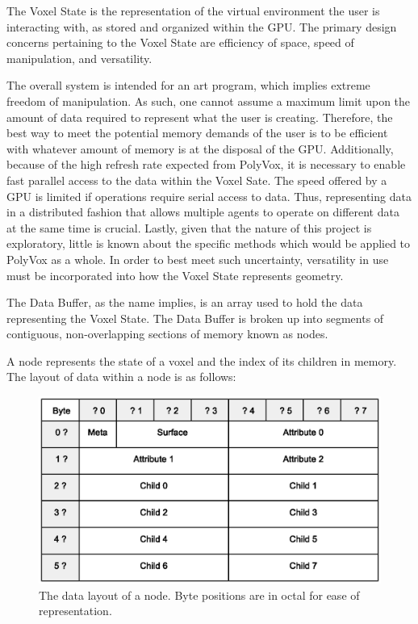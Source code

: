 \documentclass[onecolumn, draftclsnofoot,10pt, compsoc]{IEEEtran}
\newcounter{threesection}[subsubsection]
\newcounter{foursection}[threesection]
\begin{document}

The Voxel State is the representation of the virtual environment the user is interacting with, as stored and organized within the GPU.
The primary design concerns pertaining to the Voxel State are efficiency of space, speed of manipulation, and versatility. 

The overall system is intended for an art program, which implies extreme freedom of manipulation. 
As such, one cannot assume a maximum limit upon the amount of data required to represent what the user is creating.
Therefore, the best way to meet the potential memory demands of the user is to be efficient with whatever amount of memory is at the disposal of the GPU.
Additionally, because of the high refresh rate expected from PolyVox, it is necessary to enable fast parallel access to the data within the Voxel Sate.
The speed offered by a GPU is limited if operations require serial access to data.
Thus, representing data in a distributed fashion that allows multiple agents to operate on different data at the same time is crucial.
Lastly, given that the nature of this project is exploratory, little is known about the specific methods which would be applied to PolyVox as a whole.
In order to best meet such uncertainty, versatility in use must be incorporated into how the Voxel State represents geometry.


The Data Buffer, as the name implies, is an array used to hold the data representing the Voxel State.
The Data Buffer is broken up into segments of contiguous, non-overlapping sections of memory known as nodes.

A node represents the state of a voxel and the index of its children in memory. The layout of data within a node is as follows: \\

\begin{figure}[H]
\begin{center}
\includegraphics[width=\textwidth, viewport=50 120 475 380, clip=true]{nodeLayout.eps}
\caption{The data layout of a node. Byte positions are in octal for ease of representation.}
\end{center}
\end{figure}
\end{document}
